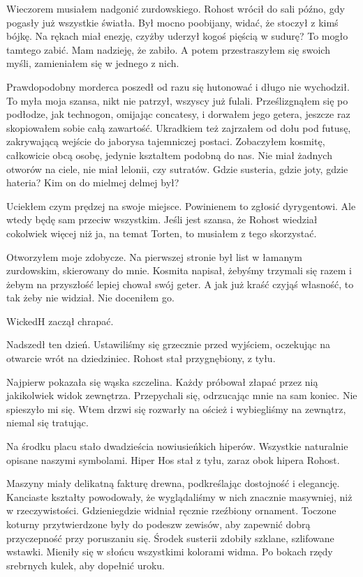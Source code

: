 Wieczorem musiałem nadgonić zurdowskiego.
Rohost wrócił do sali późno, gdy pogasły już wszystkie światła.
Był mocno poobijany, widać, że stoczył z kimś bójkę. 
Na rękach miał enezję, czyżby uderzył kogoś pięścią w sudurę? 
To mogło tamtego zabić. Mam nadzieję, że zabiło.
A potem przestraszyłem się swoich myśli, zamieniałem się w jednego z nich.

Prawdopodobny morderca poszedł od razu się hutonować i długo nie wychodził.
To myła moja szansa, nikt nie patrzył, wszyscy już fulali.
Prześlizgnąłem się po podłodze, jak technogon, omijając concatesy, i dorwałem jego getera, jeszcze raz skopiowałem sobie całą zawartość.
Ukradkiem też zajrzałem od dołu pod futusę, zakrywającą wejście do jaborysa tajemniczej postaci.
Zobaczyłem kosmitę, całkowicie obcą osobę, jedynie kształtem podobną do nas.
Nie miał żadnych otworów na ciele, nie miał lelonii, czy sutratów.
Gdzie susteria, gdzie joty, gdzie hateria?
Kim on do mielmej delmej był?

Uciekłem czym prędzej na swoje miejsce.
Powinienem to zgłosić dyrygentowi.
Ale wtedy będę sam przeciw wszystkim.
Jeśli jest szansa, że Rohost wiedział cokolwiek więcej niż ja, na temat Torten, to musiałem z tego skorzystać.

Otworzyłem moje zdobycze. 
Na pierwszej stronie był list w łamanym zurdowskim, skierowany do mnie.
Kosmita napisał, żebyśmy trzymali się razem i żebym na przyszłość lepiej chował swój geter.
A jak już kraść czyjąś własność, to tak żeby nie widział.
Nie doceniłem go.

\divider{}

WickedH zaczął chrapać.

\divider{}

Nadszedł ten dzień.
Ustawiliśmy się grzecznie przed wyjściem, oczekując na otwarcie wrót na dziedziniec.
Rohost stał przygnębiony, z tyłu.

Najpierw pokazała się wąska szczelina.
Każdy próbował złapać przez nią jakikolwiek widok zewnętrza.
Przepychali się, odrzucając mnie na sam koniec. Nie spieszyło mi się.
Wtem drzwi się rozwarły na oścież i wybiegliśmy na zewnątrz, niemal się tratując.

Na środku placu stało dwadzieścia nowiusieńkich hiperów.
Wszystkie naturalnie opisane naszymi symbolami.
Hiper Hos stał z tyłu, zaraz obok hipera Rohost.

Maszyny miały delikatną fakturę drewna, podkreślając dostojność i elegancję.
Kanciaste kształty powodowały, że wyglądaliśmy w nich znacznie masywniej, niż w rzeczywistości.
Gdzieniegdzie widniał ręcznie rzeźbiony ornament.
Toczone koturny przytwierdzone były do podeszw zewisów, aby zapewnić dobrą przyczepność przy poruszaniu się.
Środek susterii zdobiły szklane, szlifowane wstawki. Mieniły się w słońcu wszystkimi kolorami widma.
Po bokach rzędy srebrnych kulek, aby dopełnić uroku.

